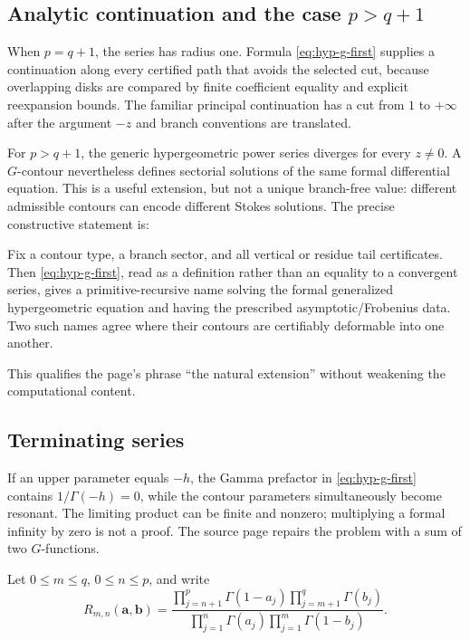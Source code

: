 \subsection{Analytic continuation and the case \texorpdfstring{$p>q+1$}{p > q + 1}}

When $p=q+1$, the series has radius one.  Formula
\eqref{eq:hyp-g-first} supplies a continuation along every certified path that
avoids the selected cut, because overlapping disks are compared by finite
coefficient equality and explicit reexpansion bounds.  The familiar principal
continuation has a cut from $1$ to $+\infty$ after the argument $-z$ and branch
conventions are translated.

For $p>q+1$, the generic hypergeometric power series diverges for every
$z\ne0$.  A $G$-contour nevertheless defines sectorial solutions of the same
formal differential equation.  This is a useful extension, but not a unique
branch-free value: different admissible contours can encode different Stokes
solutions.  The precise constructive statement is:

\begin{proposition}
Fix a contour type, a branch sector, and all vertical or residue tail
certificates.  Then \eqref{eq:hyp-g-first}, read as a definition rather than an
equality to a convergent series, gives a primitive-recursive name solving the
formal generalized hypergeometric equation and having the prescribed
asymptotic/Frobenius data.  Two such names agree where their contours are
certifiably deformable into one another.
\end{proposition}
This qualifies the page's phrase ``the natural extension'' without weakening
the computational content.

\subsection{Terminating series}

If an upper parameter equals $-h$, the Gamma prefactor in
\eqref{eq:hyp-g-first} contains $1/\Gamma(-h)=0$, while the contour parameters
simultaneously become resonant.  The limiting product can be finite and
nonzero; multiplying a formal infinity by zero is not a proof.  The source page
repairs the problem with a sum of two $G$-functions.

Let $0\le m\le q$, $0\le n\le p$, and write
\[
 R_{m,n}(\mathbf a,\mathbf b)=
 \frac{\prod_{j=n+1}^{p}\Gamma(1-a_j)
       \prod_{j=m+1}^{q}\Gamma(b_j)}
      {\prod_{j=1}^{n}\Gamma(a_j)
       \prod_{j=1}^{m}\Gamma(1-b_j)}.
\]

